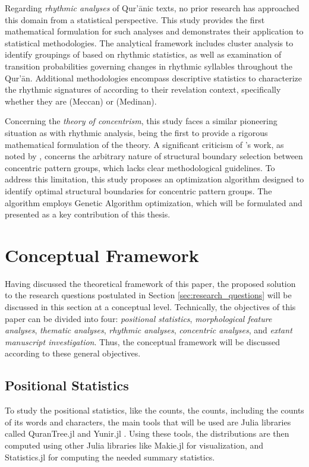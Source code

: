 Regarding \textit{rhythmic analyses} of Qur'\=anic texts, no prior research has approached this domain from a statistical perspective. This study provides the first mathematical formulation for such analyses and demonstrates their application to statistical methodologies. The analytical framework includes cluster analysis to identify groupings of   based on rhythmic statistics, as well as examination of transition probabilities governing changes in rhythmic syllables throughout the Qur'\=an. Additional methodologies encompass descriptive statistics to characterize the rhythmic signatures of   according to their revelation context, specifically whether they are   (Meccan) or   (Medinan).

Concerning the \textit{theory of concentrism}, this study faces a similar pioneering situation as with rhythmic analysis, being the first to provide a rigorous mathematical formulation of the theory. A significant criticism of 's work, as noted by , concerns the arbitrary nature of structural boundary selection between concentric pattern groups, which lacks clear methodological guidelines. To address this limitation, this study proposes an optimization algorithm designed to identify optimal structural boundaries for concentric pattern groups. The algorithm employs Genetic Algorithm optimization, which will be formulated and presented as a key contribution of this thesis.

\section{Conceptual Framework}
Having discussed the theoretical framework of this paper, the proposed solution to the research questions postulated in Section \ref{sec:research_questions} will be discussed in this section at a conceptual level. Technically, the objectives of this paper can be divided into four: \textit{positional statistics}, \textit{morphological feature analyses}, \textit{thematic analyses}, \textit{rhythmic analyses}, \textit{concentric analyses}, and \textit{extant manuscript investigation}. Thus, the conceptual framework will be discussed according to these general objectives.
\subsection{Positional Statistics}
To study the positional statistics, like the   counts, the   counts, including the counts of its words and characters, the main tools that will be used are Julia libraries called QuranTree.jl \cite{asaad2021qurantree} and Yunir.jl . Using these tools, the distributions are then computed using other Julia libraries like Makie.jl for visualization, and Statistics.jl for computing the needed summary statistics.
